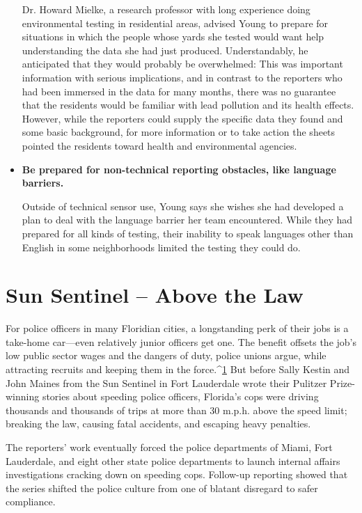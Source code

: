 \begin{itemize}
Dr. Howard Mielke, a research professor with long experience doing
environmental testing in residential areas, advised Young to prepare
for situations in which the people whose yards she tested would want
help understanding the data she had just produced. Understandably,
he anticipated that they would probably be overwhelmed: This was
important information with serious implications, and in contrast to
the reporters who had been immersed in the data for many months,
there was no guarantee that the residents would be familiar with lead
pollution and its health effects. However, while the reporters could
supply the specific data they found and some basic background, for
more information or to take action the sheets pointed the residents
toward health and environmental agencies.
\item \textbf{Be prepared for non-technical reporting obstacles, like
language barriers.}

Outside of technical sensor use, Young says she wishes she had developed
a plan to deal with the language barrier her team encountered.
While they had prepared for all kinds of testing, their inability to
speak languages other than English in some neighborhoods limited
the testing they could do.
\end{itemize}

\chapter{Sun Sentinel – Above the Law}
For police officers in many Floridian cities, a longstanding perk of their jobs
is a take-home car—even relatively junior officers get one. The benefit offsets
the job's low public sector wages and the dangers of duty, police unions
argue, while attracting recruits and keeping them in the force.^{\href{#endnotes-sun-sentinel}{1}}
But before Sally Kestin and John Maines from the Sun Sentinel in Fort Lauderdale
wrote their Pulitzer Prize-winning stories about speeding police
officers, Florida's cops were driving thousands and thousands of trips at
more than 30 m.p.h. above the speed limit; breaking the law, causing fatal
accidents, and escaping heavy penalties.

The reporters' work eventually forced the police departments of Miami,
Fort Lauderdale, and eight other state police departments to launch internal
affairs investigations cracking down on speeding cops. Follow-up reporting
showed that the series shifted the police culture from one of blatant disregard
to safer compliance.


